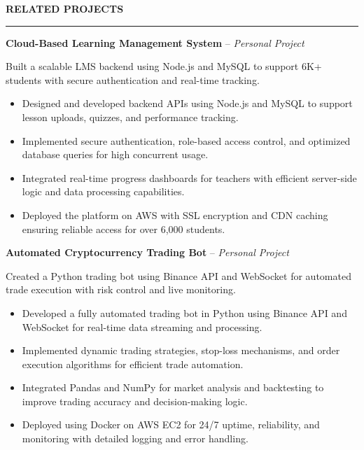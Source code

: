 \documentclass[10pt,letterpaper]{article}
\begin{document}
\vspace{6pt}

\textbf{RELATED PROJECTS}\\[-8pt]
\noindent\rule{\textwidth}{1pt}

\vspace{-2pt}

\textbf{Cloud-Based Learning Management System} -- \emph{Personal Project}

\vspace{-1pt}

Built a scalable LMS backend using Node.js and MySQL to support 6K+ students with secure authentication and real-time tracking.
\vspace{-1pt}
\begin{itemize}
\item Designed and developed backend APIs using Node.js and MySQL to support lesson uploads, quizzes, and performance tracking.
\item Implemented secure authentication, role-based access control, and optimized database queries for high concurrent usage.
\item Integrated real-time progress dashboards for teachers with efficient server-side logic and data processing capabilities.
\item Deployed the platform on AWS with SSL encryption and CDN caching ensuring reliable access for over 6,000 students.
\end{itemize}

\textbf{Automated Cryptocurrency Trading Bot} -- \emph{Personal Project}

\vspace{-1pt}

Created a Python trading bot using Binance API and WebSocket for automated trade execution with risk control and live monitoring.
\vspace{-1pt}
\begin{itemize}
\item Developed a fully automated trading bot in Python using Binance API and WebSocket for real-time data streaming and processing.
\item Implemented dynamic trading strategies, stop-loss mechanisms, and order execution algorithms for efficient trade automation.
\item Integrated Pandas and NumPy for market analysis and backtesting to improve trading accuracy and decision-making logic.
\item Deployed using Docker on AWS EC2 for 24/7 uptime, reliability, and monitoring with detailed logging and error handling.
\end{itemize}
\end{document}
